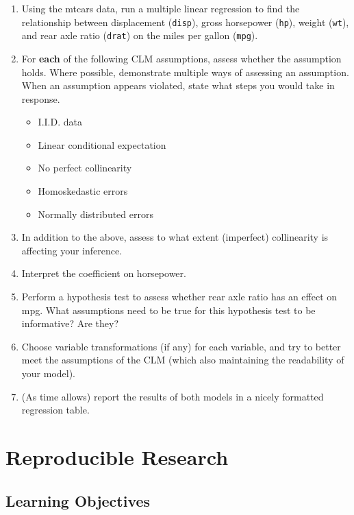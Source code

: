 \documentclass[
]{book}
\providecommand{\tightlist}{%
  \setlength{\itemsep}{0pt}\setlength{\parskip}{0pt}}
\theoremstyle{definition}
\theoremstyle{definition}
\theoremstyle{definition}
\theoremstyle{definition}
\theoremstyle{remark}
\begin{document}
\begin{enumerate}
\def\labelenumi{\arabic{enumi}.}
\item
  Using the mtcars data, run a multiple linear regression to find the relationship between displacement (\texttt{disp}), gross horsepower (\texttt{hp}), weight (\texttt{wt}), and rear axle ratio (\texttt{drat}) on the miles per gallon (\texttt{mpg}).
\item
  For \textbf{each} of the following CLM assumptions, assess whether the assumption holds. Where possible, demonstrate multiple ways of assessing an assumption. When an assumption appears violated, state what steps you would take in response.

  \begin{itemize}
  \tightlist
  \item
    I.I.D. data
  \item
    Linear conditional expectation
  \item
    No perfect collinearity
  \item
    Homoskedastic errors
  \item
    Normally distributed errors
  \end{itemize}
\item
  In addition to the above, assess to what extent (imperfect) collinearity is affecting your inference.
\item
  Interpret the coefficient on horsepower.
\item
  Perform a hypothesis test to assess whether rear axle ratio has an effect on mpg. What assumptions need to be true for this hypothesis test to be informative? Are they?
\item
  Choose variable transformations (if any) for each variable, and try to better meet the assumptions of the CLM (which also maintaining the readability of your model).
\item
  (As time allows) report the results of both models in a nicely formatted regression table.
\end{enumerate}

\hypertarget{reproducible-research}{%
\chapter{Reproducible Research}\label{reproducible-research}}

\hypertarget{learning-objectives-12}{%
\section{Learning Objectives}\label{learning-objectives-12}}
\end{document}
